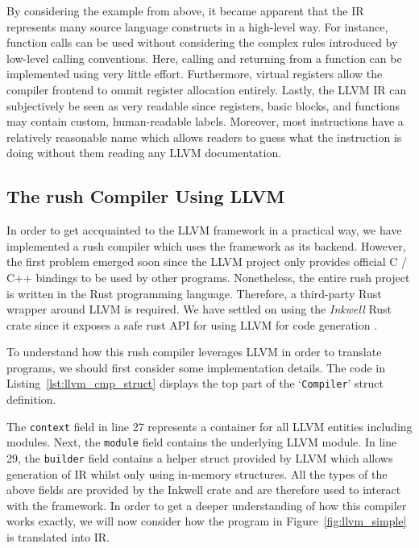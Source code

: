 By considering the example from above, it became apparent that the IR represents many source language constructs in a high-level way.
For instance, function calls can be used without considering the complex rules introduced by low-level calling conventions.
Here, calling and returning from a function can be implemented using very little effort.
Furthermore, virtual registers allow the compiler frontend to ommit register allocation entirely.
Lastly, the LLVM IR can subjectively be seen as very readable since registers, basic blocks, and functions may contain custom, human-readable labels.
Moreover, most instructions have a relatively reasonable name which allows readers to guess what the instruction is doing without them reading any LLVM documentation.


\subsection{The rush Compiler Using LLVM}

In order to get accquainted to the LLVM framework in a practical way, we have implemented a rush compiler which uses the framework as its backend.
However, the first problem emerged soon since the LLVM project only provides official C / C++ bindings to be used by other programs.
Nonetheless, the entire rush project is written in the Rust programming language.
Therefore, a third-party Rust wrapper around LLVM is required.
We have settled on using the \emph{Inkwell} Rust crate since it exposes a safe rust API for using LLVM for code generation \cite{Inkwell2023}.

To understand how this rush compiler leverages LLVM in order to translate programs, we should first consider some implementation details.
The code in Listing~\ref{lst:llvm_cmp_struct} displays the top part of the `\texttt{Compiler}' struct definition.


The \texttt{context} field in line 27 represents a container for all LLVM entities including modules.
Next, the \texttt{module} field contains the underlying LLVM module.
In line 29, the \texttt{builder} field contains a helper struct provided by LLVM which allows generation of IR whilst only using in-memory structures.
All the types of the above fields are provided by the Inkwell crate and are therefore used to interact with the framework.
In order to get a deeper understanding of how this compiler works exactly, we will now consider how the program in Figure~\ref{fig:llvm_simple} is translated into IR.

